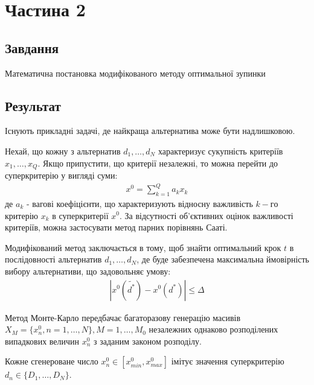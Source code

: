 \section{Частина 2}
\label{sec:task2}

\subsection{Завдання}
\label{subsec:task2_task}

Математична постановка модифікованого методу оптимальної зупинки

\subsection{Результат}
\label{subsec:task2_result}

Існують прикладні задачі, де найкраща альтернатива
може бути надлишковою.

Нехай, що кожну з альтернатив $d_1, \dots, d_N$ характеризує
сукупність критеріїв $x_1, \dots, x_Q$. Якщо припустити,
що критерії незалежні, то можна перейти до суперкритерію
у вигляді суми:
\begin{align}
    x^0 = \sum_{k = 1}^Q a_k x_k
\end{align}
де $a_k$ - вагові коефіцієнти, що характеризують відносну
важливість $k-го$ критерію $x_k$ в суперкритерії $x^0$.
За відсутності об'єктивних оцінок важливості критеріїв,
можна застосувати метод парних порівнянь Сааті.

Модифікований метод заключається в тому, щоб знайти оптимальний
крок $t$ в послідовності альтернатив $d_1, \dots, d_N$, де
буде забезпечена максимальна ймовірність вибору альтернативи,
що задовольняє умову:
\begin{align}
    |x^0(\widetilde{d^*}) - x^0(d^*)| \leq \Delta
\end{align}

Метод Монте-Карло передбачає багаторазову генерацію масивів
$X_M = \{x_n^0, n = 1, \dots, N\}, M = 1, \dots, M_0$
незалежних однаково розподілених випадкових величин $x_n^0$
з заданим законом розподілу.

Кожне сгенероване число $x_n^0 \in [x_{min}^0, x_{max}^0]$
імітує значення суперкритерію $d_n \in \{D_1, \dots, D_N\}$.

